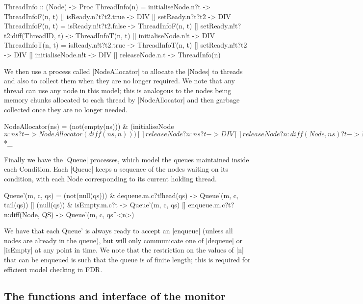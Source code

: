 \begin{cspm}
  ThreadInfo :: (Node) -> Proc
  ThreadInfo(n) = 
       initialiseNode.n?t -> ThreadInfoF(n, t)
    [] isReady.n?t?t2.true -> DIV
    [] setReady.n?t?t2 -> DIV
  ThreadInfoF(n, t) =  
       isReady.n!t?t2.false -> ThreadInfoF(n, t)
    [] setReady.n!t?t2:diff(ThreadID, t) -> ThreadInfoT(n, t)
    [] initialiseNode.n!t -> DIV
  ThreadInfoT(n, t) = 
       isReady.n!t?t2.true -> ThreadInfoT(n, t)
    [] setReady.n!t?t2 -> DIV
    [] initialiseNode.n!t -> DIV
    [] releaseNode.n.t -> ThreadInfo(n)
\end{cspm}


We then use a process called |NodeAllocator| to allocate the |Nodes| to threads and also to collect them when they are no longer required.
We note that any thread can use any node in this model; this is analogous to the nodes being memory chunks allocated to each thread by |NodeAllocator| and then garbage collected once they are no longer needed.

\begin{cspm}
  NodeAllocator(ns) = 
    (not(empty(ns))) & 
      (initialiseNode$n:ns?t -> NodeAllocator(diff(ns, {n})))
  [] releaseNode?n:ns?t -> DIV
  [] releaseNode?n:diff(Node, ns)?t -> NodeAllocator(union(ns, {n}))_*$*_
\end{cspm}

Finally we have the |Queue| processes, which model the queues maintained inside each Condition. Each |Queue| keeps a sequence of the nodes waiting on its condition, with each Node corresponding to its current holding thread.

\begin{cspm}
  Queue'(m, c, qs) = 
       (not(null(qs))) & dequeue.m.c?t!head(qs) -> Queue'(m, c, tail(qs))
    [] (null(qs)) & isEmpty.m.c?t -> Queue'(m, c, qs)
    [] enqueue.m.c?t?n:diff(Node, QS) -> Queue'(m, c, qs^<n>) 
\end{cspm}

We have that each Queue' is always ready to accept an |enqueue| (unless all nodes are already in the queue), but will only communicate one of |dequeue| or |isEmpty| at any point in time. We note that the restriction on the values of |n| that can be enqueued is such that the queue is of finite length; this is required for efficient model checking in FDR.

\subsection{The functions and interface of the monitor}

